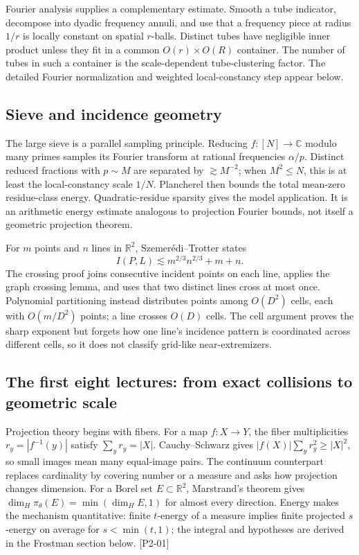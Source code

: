 Fourier analysis supplies a complementary estimate. Smooth a tube indicator, decompose into dyadic frequency annuli, and use that a frequency piece at radius \(1/r\) is locally constant on spatial \(r\)-balls. Distinct tubes have negligible inner product unless they fit in a common \(O(r)\times O(R)\) container. The number of tubes in such a container is the scale-dependent tube-clustering factor. The detailed Fourier normalization and weighted local-constancy step appear below.

\subsection{Sieve and incidence geometry}\label{04-visual-computing-ii-ch033-sieve-and-incidence-geometry}

The large sieve is a parallel sampling principle. Reducing \(f:[N]\to\mathbb C\) modulo many primes samples its Fourier transform at rational frequencies \(\alpha/p\). Distinct reduced fractions with \(p\sim M\) are separated by \(\gtrsim M^{-2}\); when \(M^2\le N\), this is at least the local-constancy scale \(1/N\). Plancherel then bounds the total mean-zero residue-class energy. Quadratic-residue sparsity gives the model application. It is an arithmetic energy estimate analogous to projection Fourier bounds, not itself a geometric projection theorem.

For \(m\) points and \(n\) lines in \(\mathbb R^2\), Szemerédi--Trotter states \[I(P,L)\lesssim m^{2/3}n^{2/3}+m+n.\] The crossing proof joins consecutive incident points on each line, applies the graph crossing lemma, and uses that two distinct lines cross at most once. Polynomial partitioning instead distributes points among \(O(D^2)\) cells, each with \(O(m/D^2)\) points; a line crosses \(O(D)\) cells. The cell argument proves the sharp exponent but forgets how one line's incidence pattern is coordinated across different cells, so it does not classify grid-like near-extremizers.

\subsection{The first eight lectures: from exact collisions to geometric scale}\label{04-visual-computing-ii-ch033-the-first-eight-lectures-from-exact-collisions-to-geometric-scale}

Projection theory begins with fibers. For a map \(f:X\to Y\), the fiber multiplicities \(r_y=|f^{-1}(y)|\) satisfy \(\sum_y r_y=|X|\). Cauchy--Schwarz gives \(|f(X)|\sum_y r_y^2\ge|X|^2\), so small images mean many equal-image pairs. The continuum counterpart replaces cardinality by covering number or a measure and asks how projection changes dimension. For a Borel set \(E\subset\mathbb R^2\), Marstrand's theorem gives \(\dim_H\pi_\theta(E)=\min(\dim_HE,1)\) for almost every direction. Energy makes the mechanism quantitative: finite \(t\)-energy of a measure implies finite projected \(s\)-energy on average for \(s<\min(t,1)\); the integral and hypotheses are derived in the Frostman section below. {[}P2-01{]}

